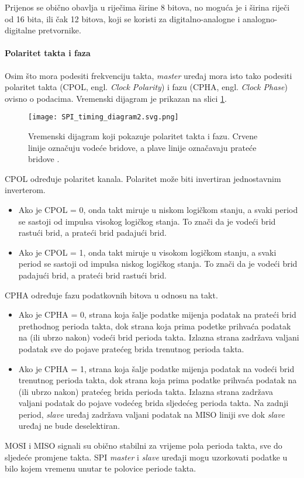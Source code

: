 Prijenos se obično obavlja u riječima širine 8 bitova, no moguća je i širina riječi od 16 bita, ili čak 12 bitova, koji se koristi za digitalno-analogne i analogno-digitalne pretvornike.

\paragraph{Polaritet takta i faza}

Osim što mora podesiti frekvenciju takta, \textit{master} uređaj mora isto tako podesiti polaritet takta (CPOL, engl. \textit{Clock Polarity}) i fazu (CPHA, engl. \textit{Clock Phase}) ovisno o podacima. Vremenski dijagram je prikazan na slici \ref{fig:spi_timing_diagram}.
\begin{figure}[H]
	\centering
	\texttt{[image: SPI\_timing\_diagram2.svg.png]}
	\caption{Vremenski dijagram koji pokazuje polaritet takta i fazu. Crvene linije označuju vodeće bridove, a plave linije označavaju prateće bridove \cite{spi_wikipedia}.}
	\label{fig:spi_timing_diagram}
\end{figure}
CPOL određuje polaritet kanala. Polaritet može biti invertiran jednostavnim inverterom.
\begin{itemize}
	\item Ako je CPOL = 0, onda takt miruje u niskom logičkom stanju, a svaki period se sastoji od impulsa visokog logičkog stanja. To znači da je vodeći brid rastući brid, a prateći brid padajući brid.
	\item Ako je CPOL = 1, onda takt miruje u visokom logičkom stanju, a svaki period se sastoji od impulsa niskog logičkog stanja. To znači da je vodeći brid padajući brid, a prateći brid rastući brid.
\end{itemize}
CPHA određuje fazu podatkovnih bitova u odnosu na takt.
\begin{itemize}
	\item Ako je CPHA = 0, strana koja šalje podatke mijenja podatak na prateći brid prethodnog perioda takta, dok strana koja prima podetke prihvaća podatak na (ili ubrzo nakon) vodeći brid perioda takta. Izlazna strana zadržava valjani podatak sve do pojave pratećeg brida trenutnog perioda takta.
	\item Ako je CPHA = 1, strana koja šalje podatke mijenja podatak na vodeći brid trenutnog perioda takta, dok strana koja prima podatke prihvaća podatak na (ili ubrzo nakon) pratećeg brida perioda takta. Izlazna strana zadržava valjani podatak do pojave vodećeg brida sljedećeg perioda takta. Na zadnji period, \textit{slave} uređaj zadržava valjani podatak na MISO liniji sve dok \textit{slave} uređaj ne bude deselektiran.
\end{itemize}
MOSI i MISO signali su obično stabilni za vrijeme pola perioda takta, sve do sljedeće promjene takta. SPI \textit{master} i \textit{slave} uređaji mogu uzorkovati podatke u bilo kojem vremenu unutar te polovice periode takta.

